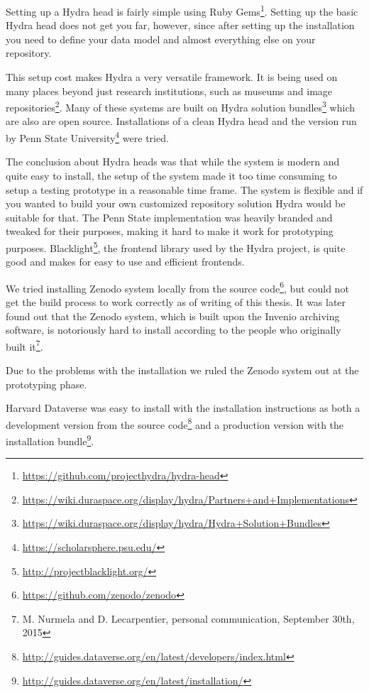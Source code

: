Setting up a Hydra head is fairly simple using Ruby
Gems\footnote{\url{https://github.com/projecthydra/hydra-head}}.
Setting up the basic Hydra head
does not get you far, however, since after setting up the installation you need
to define your data model and almost everything else on your repository.

This setup cost makes Hydra a very versatile framework. It is being used on many
places beyond just research institutions, such as museums and image
repositories\footnote{\url{https://wiki.duraspace.org/display/hydra/Partners+and+Implementations}}.
Many of these systems are built on Hydra solution
bundles\footnote{\url{https://wiki.duraspace.org/display/hydra/Hydra+Solution+Bundles}}
which are also
are open source. Installations of a clean Hydra head and the version
run by Penn State University\footnote{\url{https://scholarsphere.psu.edu/}} were tried.

The conclusion about Hydra heads was that while the system is modern and quite
easy to install, the setup of the system made it too time consuming to setup a
testing prototype in a reasonable time frame. The system is flexible and if you
wanted to build your own customized repository solution Hydra would be suitable
for that. The Penn State implementation was heavily branded and tweaked for
their purposes, making it hard to make it work for prototyping purposes.
Blacklight\footnote{\url{http://projectblacklight.org/}},
the frontend library used by the Hydra
project, is quite good and makes for easy to use and efficient frontends.

We tried installing Zenodo system locally from the source
code\footnote{\url{https://github.com/zenodo/zenodo}}, but could not get the
build process to work correctly as of writing of this thesis.
It was later found out that the Zenodo system, which is built upon the Invenio
archiving software, is notoriously hard to install according to the people who
originally built it\footnote{M. Nurmela and D. Lecarpentier, personal
communication, September 30th, 2015}.

Due to the problems with the installation we ruled the Zenodo system out at
the prototyping phase.

Harvard Dataverse was easy to install with the installation instructions as
both a development version from the source
code\footnote{\url{http://guides.dataverse.org/en/latest/developers/index.html}} and a
production version with
the installation bundle\footnote{\url{http://guides.dataverse.org/en/latest/installation/}}.

